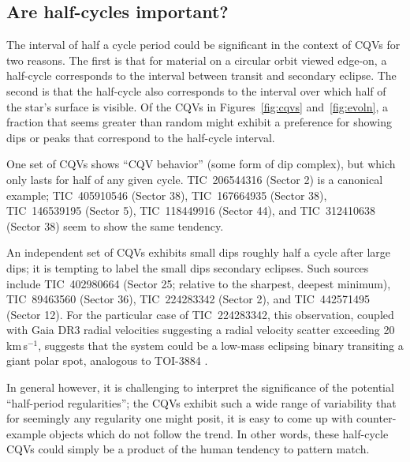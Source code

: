 \documentclass[11pt,twocolumn,tighten]{aastex63}
\newcommand{\kms}{{km\,s$^{-1}$}}
\begin{document}
\subsection{Are half-cycles important?}

The interval of half a cycle period could be significant in the
context of CQVs for two reasons.  The first is that for material on a
circular orbit viewed edge-on, a half-cycle corresponds to the
interval between transit and secondary eclipse.  The second is that
the half-cycle also corresponds to the interval over which half of the
star's surface is visible.  Of the CQVs in Figures~\ref{fig:cqvs}
and~\ref{fig:evoln}, a fraction that seems greater than random might
exhibit a preference for showing dips or peaks that correspond to the
half-cycle interval.

One set of CQVs shows ``CQV behavior'' (some form of dip complex), but
which only lasts for half of any given cycle.  TIC~206544316 (Sector
2) is a canonical example; TIC~405910546 (Sector 38), TIC~167664935
(Sector 38), TIC~146539195 (Sector 5), TIC~118449916 (Sector 44), and
TIC~312410638 (Sector 38) seem to show the same tendency.

An independent set of CQVs exhibits small dips roughly half a cycle
after large dips; it is tempting to label the small dips secondary
eclipses.  Such sources include TIC~402980664 (Sector 25; relative to
the sharpest, deepest minimum), TIC~89463560 (Sector 36),
TIC~224283342 (Sector 2), and TIC~442571495 (Sector 12).  For the
particular case of TIC~224283342, this observation, coupled with Gaia
DR3 radial velocities suggesting a radial velocity scatter exceeding
20\,\kms, suggests that the system could be a low-mass eclipsing
binary transiting a giant polar spot, analogous to TOI-3884
\citep{2022A&A...667L..11A}.

In general however, it is challenging to interpret the significance of
the potential ``half-period regularities'';  the CQVs exhibit such a
wide range of variability that for seemingly any regularity one might
posit, it is easy to come up with counter-example objects which do not
follow the trend.  In other words, these half-cycle CQVs could simply
be a product of the human tendency to pattern match.
\end{document}
